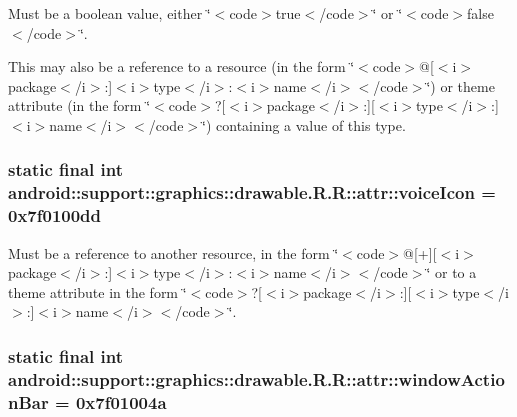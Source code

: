 Must be a boolean value, either \char`\"{}$<$code$>$true$<$/code$>$\char`\"{} or \char`\"{}$<$code$>$false$<$/code$>$\char`\"{}. 

This may also be a reference to a resource (in the form \char`\"{}$<$code$>$@\mbox{[}$<$i$>$package$<$/i$>$:\mbox{]}$<$i$>$type$<$/i$>$:$<$i$>$name$<$/i$>$$<$/code$>$\char`\"{}) or theme attribute (in the form \char`\"{}$<$code$>$?\mbox{[}$<$i$>$package$<$/i$>$:\mbox{]}\mbox{[}$<$i$>$type$<$/i$>$:\mbox{]}$<$i$>$name$<$/i$>$$<$/code$>$\char`\"{}) containing a value of this type. \hypertarget{classandroid_1_1support_1_1graphics_1_1drawable_1_1_r_1_1attr_5c0ecb3bfea1e3e28ae31646cb4f6655}{
\subsubsection[{voiceIcon}]{\setlength{\rightskip}{0pt plus 5cm}static final int android::support::graphics::drawable.R.R::attr::voiceIcon = 0x7f0100dd}}
\label{classandroid_1_1support_1_1graphics_1_1drawable_1_1_r_1_1attr_5c0ecb3bfea1e3e28ae31646cb4f6655}


Must be a reference to another resource, in the form \char`\"{}$<$code$>$@\mbox{[}+\mbox{]}\mbox{[}$<$i$>$package$<$/i$>$:\mbox{]}$<$i$>$type$<$/i$>$:$<$i$>$name$<$/i$>$$<$/code$>$\char`\"{} or to a theme attribute in the form \char`\"{}$<$code$>$?\mbox{[}$<$i$>$package$<$/i$>$:\mbox{]}\mbox{[}$<$i$>$type$<$/i$>$:\mbox{]}$<$i$>$name$<$/i$>$$<$/code$>$\char`\"{}. \hypertarget{classandroid_1_1support_1_1graphics_1_1drawable_1_1_r_1_1attr_2b534d58e927dbf03030703f1c9edd56}{
\subsubsection[{windowActionBar}]{\setlength{\rightskip}{0pt plus 5cm}static final int android::support::graphics::drawable.R.R::attr::windowActionBar = 0x7f01004a}}
\label{classandroid_1_1support_1_1graphics_1_1drawable_1_1_r_1_1attr_2b534d58e927dbf03030703f1c9edd56}


